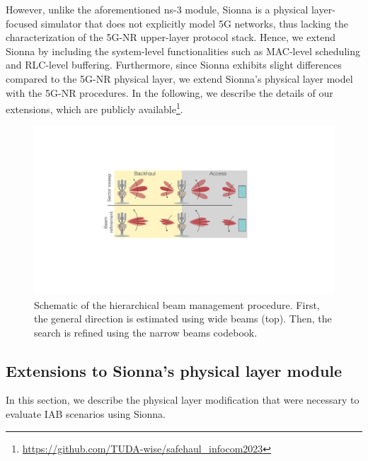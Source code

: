 However, unlike the aforementioned ns-3 module, Sionna is a physical layer-focused simulator that does not explicitly model 5G networks, thus lacking  the characterization of the 5G-NR upper-layer protocol stack. Hence, we extend Sionna by including the system-level functionalities such as MAC-level scheduling and RLC-level buffering. Furthermore, since Sionna exhibits slight differences compared to the 5G-NR physical layer, we extend Sionna's physical layer model~\cite{hoydis2022sionna} with the 5G-NR procedures. In the following, we describe the details of our extensions, which are publicly available\footnote{\url{https://github.com/TUDA-wise/safehaul_infocom2023}}.


\begin{figure}[t!]
    \centering
    \includegraphics[scale=0.18]{Figures/Safehaul/Beamforming-2.pdf}
      \caption{Schematic of the hierarchical beam management procedure. First, the general direction is estimated using wide beams (top). Then, the search is refined using the narrow beams codebook.}
      \label{fig:beamforming}
      \vspace{-5mm}
\end{figure}



\subsection{Extensions to Sionna's physical layer module}
\label{sub:additionalSionna}
In this section, we describe the physical layer modification that were necessary to evaluate IAB scenarios using Sionna. 

